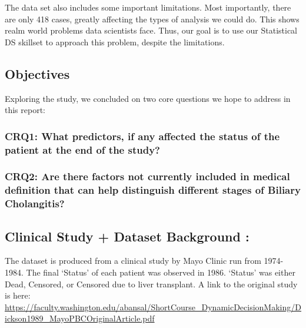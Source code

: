 \documentclass[
]{article}
\begin{document}
The data set also includes some important limitations. Most importantly,
there are only 418 cases, greatly affecting the types of analysis we
could do. This shows realm world problems data scientists face. Thus,
our goal is to use our Statistical DS skillset to approach this problem,
despite the limitations.

\hypertarget{objectives}{%
\subsection{Objectives}\label{objectives}}

Exploring the study, we concluded on two core questions we hope to
address in this report:

\hypertarget{crq1-what-predictors-if-any-affected-the-status-of-the-patient-at-the-end-of-the-study}{%
\subsubsection{CRQ1: What predictors, if any affected the status of the
patient at the end of the
study?}\label{crq1-what-predictors-if-any-affected-the-status-of-the-patient-at-the-end-of-the-study}}

\hypertarget{crq2-are-there-factors-not-currently-included-in-medical-definition-that-can-help-distinguish-different-stages-of-biliary-cholangitis}{%
\subsubsection{CRQ2: Are there factors not currently included in medical
definition that can help distinguish different stages of Biliary
Cholangitis?}\label{crq2-are-there-factors-not-currently-included-in-medical-definition-that-can-help-distinguish-different-stages-of-biliary-cholangitis}}

\hypertarget{clinical-study-dataset-background}{%
\subsection{Clinical Study + Dataset Background
:}\label{clinical-study-dataset-background}}

The dataset is produced from a clinical study by Mayo Clinic run from
1974-1984. The final `Status' of each patient was observed in 1986.
`Status' was either Dead, Censored, or Censored due to liver transplant.
A link to the original study is here:
\url{https://faculty.washington.edu/abansal/ShortCourse_DynamicDecisionMaking/Dickson1989_MayoPBCOriginalArticle.pdf}
\end{document}

